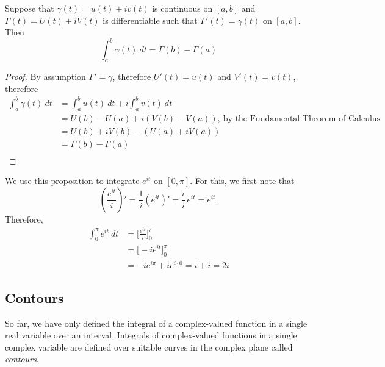 \medskip

\begin{proposition}\label{pathftc}
Suppose that $\gamma(t) = u(t) + iv(t)$ is continuous on $[a,b]$ and $\Gamma(t) = U(t) + iV(t)$ is differentiable such that $\Gamma'(t) = \gamma(t)$ on $[a,b]$. Then
\[\int_a^b\gamma(t)\ dt = \Gamma(b) - \Gamma(a)\]
\end{proposition}
\begin{proof}
By assumption $\Gamma' = \gamma$, therefore $U'(t) = u(t)$ and $V'(t) = v(t)$, therefore
\begin{align*}
\int_a^b\gamma(t)\ dt &= \int_a^bu(t)\ dt + i\int_a^bv(t)\ dt\\[0.5em]
&= U(b) - U(a) + i(V(b) - V(a)),\ \text{by the Fundamental Theorem of Calculus}\\[0.5em]
&= U(b) + iV(b) - (U(a) + iV(a))\\[0.5em]
&= \Gamma(b) - \Gamma(a)\\[-2.5em]
\end{align*}
\end{proof}

\medskip

\begin{example}
We use this proposition to integrate $e^{it}$ on $[0,\pi]$. For this, we first note that
\[\left(\frac{e^{it}}{i}\right)' = \frac{1}{i}\left(e^{it}\right)' = \frac{i}{i}\,e^{it} = e^{it}.\]
Therefore, 
\begin{align*}
\int_0^\pi e^{it}\ dt &= \Bigg[\frac{e^{it}}{i}\Bigg]_0^\pi\\[0.5em]
&= \Big[-ie^{it}\Big]_0^\pi\\[0.5em]
&= -ie^{i\pi} + ie^{i\cdot 0} = i + i = 2i
\end{align*}
\end{example}

\bigskip

\subsection{Contours}

So far, we have only defined the integral of a complex-valued function in a single real variable over an interval. Integrals of complex-valued functions in a single complex variable are defined over suitable curves in the complex plane called \emph{contours}.

